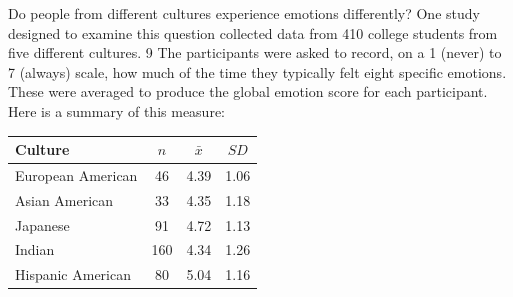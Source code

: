 \documentclass[11pt]{exam}
\begin{document}
\begin{questions}




\newpage



\question Do people from different cultures experience
emotions differently? One study designed to
examine this question collected data from 410
college students from five different cultures. 9 The
participants were asked to record, on a 1 (never)
to 7 (always) scale, how much of the time they
typically felt eight specific emotions. These were
averaged to produce the global emotion score
for each participant. Here is a summary of this
measure: 
\begin{center}
\begin{tabular}{lccc}
\hline
Culture & $n$ & $\bar{x}$ & $SD$ \\
\hline
European American  &  46 & 4.39 & 1.06 \\
Asian American & 33 & 4.35 & 1.18  \\
Japanese & 91 & 4.72 & 1.13   \\
Indian & 160 &  4.34 & 1.26 \\
Hispanic American & 80 & 5.04 & 1.16 \\ \hline
\end{tabular}
\end{center}


\end{questions}
\end{document}
